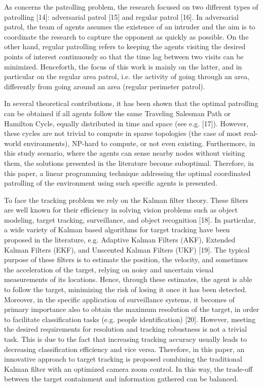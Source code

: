 \documentclass[conference]{IEEEtran}
\begin{document}
As concerns the patrolling problem, the research focused on two different types of patrolling [14]: adversarial patrol [15] and regular patrol [16]. In adversarial patrol, the team of agents assumes the existence of an intruder and the aim is to coordinate the research to capture the opponent as quickly as possible. On the other hand, regular patrolling refers to keeping the agents visiting the desired points of interest continuously so that the time lag between two visits can be minimized. Henceforth, the focus of this work is mainly on the latter, and in particular on the regular area patrol, i.e. the activity of going through an area, differently from going around an area (regular perimeter patrol).

In several theoretical contributions, it has been shown that the optimal patrolling can be obtained if all agents follow the same Traveling Salesman Path or Hamilton Cycle, equally distributed in time and space (see e.g. [17]). However, these cycles are not trivial to compute in sparse topologies (the case of most real-world environments), NP-hard to compute, or not even existing. Furthermore, in this study scenario, where the agents can sense nearby nodes without visiting them, the solutions presented in the literature become suboptimal. Therefore, in this paper, a linear programming technique addressing the optimal coordinated patrolling of the environment using such specific agents is presented.

To face the tracking problem we rely on the Kalman filter theory. These filters are well known for their efficiency in solving vision problems such as object modeling, target tracking, surveillance, and object recognition [18]. In particular, a wide variety of Kalman based algorithms for target tracking have been proposed in the literature, e.g. Adaptive Kalman Filters (AKF), Extended Kalman Filters (EKF), and Unscented Kalman Filters (UKF) [19]. The typical purpose of these filters is to estimate the position, the velocity, and sometimes the acceleration of the target, relying on noisy and uncertain visual measurements of its locations. Hence, through these estimates, the agent is able to follow the target, minimizing the risk of losing it once it has been detected. Moreover, in the specific application of surveillance systems, it becomes of primary importance also to obtain the maximum resolution of the target, in order to facilitate classification tasks (e.g. people identification) [20]. However, meeting the desired requirements for resolution and tracking robustness is not a trivial task. This is due to the fact that increasing tracking accuracy usually leads to decreasing classification efficiency and vice versa. Therefore, in this paper, an innovative approach to target tracking is proposed combining the traditional Kalman filter with an optimized camera zoom control. In this way, the trade-off between the target containment and information gathered can be balanced.
\end{document}
